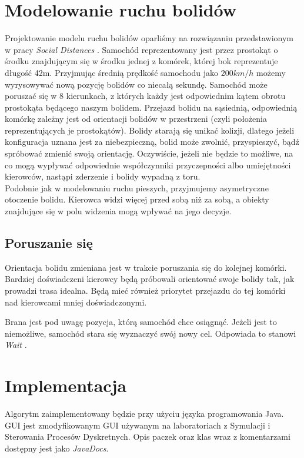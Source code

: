 \documentclass[12p]{extarticle}
\begin{document}
\section{Modelowanie ruchu bolidów}
Projektowanie modelu ruchu bolidów oparliśmy na rozwiązaniu przedstawionym w pracy \textit{Social Distances} \cite{was}. Samochód reprezentowany jest przez prostokąt o środku znajdującym się w środku jednej z komórek, której bok reprezentuje długość 42m. Przyjmując średnią prędkość samochodu jako $200 km/h$ możemy wyrysowywać nową pozycję bolidów co niecałą sekundę. Samochód może poruszać się w 8 kierunkach, z których każdy jest odpowiednim kątem obrotu prostokąta będącego naszym bolidem. Przejazd bolidu na sąsiednią, odpowiednią komórkę zależny jest od orientacji bolidów w przestrzeni (czyli położenia reprezentujących je prostokątów). Bolidy starają się unikać kolizji, dlatego jeżeli konfiguracja uznana jest za niebezpieczną, bolid może zwolnić, przyspieszyć, bądź spróbować zmienić swoją orientację. Oczywiście, jeżeli nie będzie to możliwe, na co mogą wypływać odpowiednie współczynniki przyczepności albo umiejętności kierowców, nastąpi zderzenie i bolidy wypadną z toru.   \\

Podobnie jak w modelowaniu ruchu pieszych, przyjmujemy asymetryczne otoczenie bolidu. Kierowca widzi więcej przed sobą niż za sobą, a obiekty znajdujące się w polu widzenia mogą wpływać na jego decyzje. 

\subsection{Poruszanie się}
Orientacja bolidu zmieniana jest w trakcie poruszania się do kolejnej komórki. Bardziej doświadczeni kierowcy będą próbowali orientować swoje bolidy tak, jak prowadzi trasa idealna. Będą mieć również priorytet przejazdu do tej komórki nad kierowcami mniej doświadczonymi. 

Brana jest pod uwagę pozycja, którą samochód chce osiągnąć. Jeżeli jest to niemożliwe, samochód stara się wyznaczyć swój nowy cel. Odpowiada to stanowi \textit{Wait} \cite{was}. 

\section{Implementacja}
Algorytm zaimplementowany będzie przy użyciu języka programowania Java. GUI jest zmodyfikowanym GUI używanym na laboratoriach z Symulacji i Sterowania Procesów Dyskretnych. Opis paczek oraz klas wraz z komentarzami dostępny jest jako \textit{JavaDocs}.
	


\end{document}
